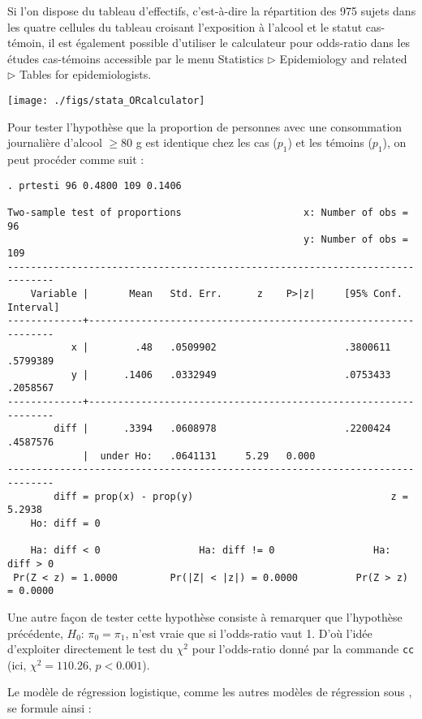Si l'on dispose du tableau d'effectifs, c'est-à-dire la répartition des 975
sujets dans les quatre cellules du tableau croisant l'exposition à l'alcool
et le statut cas-témoin, il est également possible d'utiliser le calculateur
pour odds-ratio dans les études cas-témoins accessible par le menu
\textsf{Statistics} $\rhd$ \textsf{Epidemiology and related} $\rhd$
\textsf{Tables for epidemiologists}.

\texttt{[image: ./figs/stata\_ORcalculator]}

Pour tester l'hypothèse que la proportion de personnes avec une consommation
journalière d'alcool $\ge 80$ g est identique chez les cas ($p_1$) et les
témoins ($p_1$), on peut procéder comme suit :
\begin{verbatim}
. prtesti 96 0.4800 109 0.1406

Two-sample test of proportions                     x: Number of obs =       96
                                                   y: Number of obs =      109
------------------------------------------------------------------------------
    Variable |       Mean   Std. Err.      z    P>|z|     [95% Conf. Interval]
-------------+----------------------------------------------------------------
           x |        .48   .0509902                      .3800611    .5799389
           y |      .1406   .0332949                      .0753433    .2058567
-------------+----------------------------------------------------------------
        diff |      .3394   .0608978                      .2200424    .4587576
             |  under Ho:   .0641131     5.29   0.000
------------------------------------------------------------------------------
        diff = prop(x) - prop(y)                                  z =   5.2938
    Ho: diff = 0

    Ha: diff < 0                 Ha: diff != 0                 Ha: diff > 0
 Pr(Z < z) = 1.0000         Pr(|Z| < |z|) = 0.0000          Pr(Z > z) = 0.0000
\end{verbatim}

Une autre façon de tester cette hypothèse consiste à remarquer que
l'hypothèse précédente, $H_0:\, \pi_0=\pi_1$, n'est vraie que si
l'odds-ratio vaut 1. D'où l'idée d'exploiter directement le test du $\chi^2$
pour l'odds-ratio donné par la commande \texttt{cc} (ici, $\chi^2=110.26$,
$p<0.001$). 

Le modèle de régression logistique, comme les autres modèles de régression
sous \Stata, se formule ainsi : 

